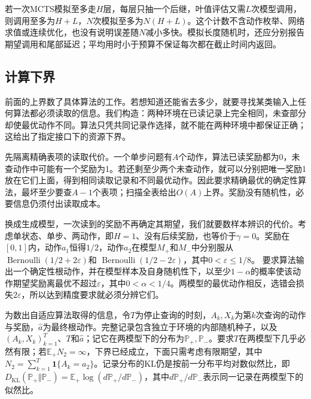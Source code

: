 若一次MCTS模拟至多走$H$层，每层只抽一个后继，叶值评估又需$L$次模型调用，则调用至多为$H+L$，$N$次模拟至多为$N(H+L)$。这个计数不含动作枚举、网络求值或连续优化，也没有说明误差随$N$减小多快。模拟长度随机时，还应分别报告期望调用和尾部延迟；平均用时小于预算不保证每次都在截止时间内返回。

\subsection{计算下界}
\label{sec:rl-planning-lower-bounds}

前面的上界数了具体算法的工作。若想知道还能省去多少，就要寻找某类输入上任何算法都必须读取的信息。我们构造：两种环境在已读记录上完全相同，未查部分却使最优动作不同。算法只凭共同记录作选择，就不能在两种环境中都保证正确；这给出了指定接口下的资源下界。

先隔离精确表项的读取代价。一个单步问题有$A$个动作，算法已读奖励都为0，未查动作中可能有一个奖励为1。若还剩至少两个未查动作，就可以分别把唯一奖励1放在它们上面，得到相同读取记录和不同最优动作。因此要求精确最优的确定性算法，最坏至少要查$A-1$个表项；扫描全表给出$O(A)$上界。奖励没有随机性，必要信息仍须付出读取成本。

换成生成模型，一次读到的奖励不再确定其期望，我们就要数样本辨识的代价。考虑单状态、单步、两动作，即$H=1$、没有后续奖励，也等价于$\gamma=0$。奖励在$[0,1]$内，动作$a_1$恒得$1/2$，动作$a_2$在模型$M_+$和$M_-$中分别服从
$\operatorname{Bernoulli}(1/2+2\varepsilon)$和
$\operatorname{Bernoulli}(1/2-2\varepsilon)$，其中$0<\varepsilon\leq1/8$。
要求算法输出一个确定性根动作，并在模型样本及自身随机性下，以至少$1-\alpha$的概率使该动作期望奖励离最优不超过$\varepsilon$，其中$0<\alpha<1/4$。两模型的最优动作相反，选错会损失$2\varepsilon$，所以达到精度要求就必须分辨它们。

为数出自适应算法取得的信息，令$T$为停止查询的时刻，$A_k,X_k$为第$k$次查询的动作与奖励，$\widehat a$为最终根动作。完整记录包含独立于环境的内部随机种子，以及$(A_k,X_k)_{k=1}^T$、$T$和$\widehat a$；记它在两模型下的分布为$\mathbb P_+,\mathbb P_-$。要求$T$在两模型下几乎必然有限；若$\mathbb E_+N_2=\infty$，下界已经成立，下面只需考虑有限期望，其中$N_2=\sum_{k=1}^T\mathbf1\{A_k=a_2\}$。记录分布的KL仍是按前一分布平均对数似然比，即$D_{\mathrm{KL}}(\mathbb P_+\Vert\mathbb P_-)=\mathbb E_+\log(d\mathbb P_+/d\mathbb P_-)$，其中$d\mathbb P_+/d\mathbb P_-$表示同一记录在两模型下的似然比。

